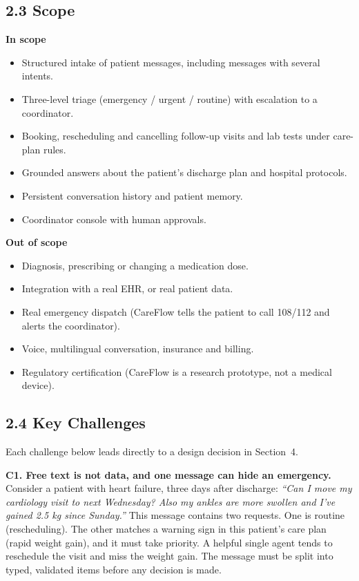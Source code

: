 \documentclass[11pt,a4paper]{article}
\begin{document}
\subsection*{2.3 Scope}

\begin{minipage}[t]{0.49\textwidth}
\textbf{In scope}
\begin{itemize}
    \item Structured intake of patient messages, including messages with several intents.
    \item Three-level triage (emergency / urgent / routine) with escalation to a coordinator.
    \item Booking, rescheduling and cancelling follow-up visits and lab tests under care-plan rules.
    \item Grounded answers about the patient's discharge plan and hospital protocols.
    \item Persistent conversation history and patient memory.
    \item Coordinator console with human approvals.
\end{itemize}
\end{minipage}\hfill
\begin{minipage}[t]{0.49\textwidth}
\textbf{Out of scope}
\begin{itemize}
    \item Diagnosis, prescribing or changing a medication dose.
    \item Integration with a real EHR, or real patient data.
    \item Real emergency dispatch (CareFlow tells the patient to call 108/112 and alerts the coordinator).
    \item Voice, multilingual conversation, insurance and billing.
    \item Regulatory certification (CareFlow is a research prototype, not a medical device).
\end{itemize}
\end{minipage}

\subsection*{2.4 Key Challenges}

Each challenge below leads directly to a design decision in Section~4.

\textbf{C1. Free text is not data, and one message can hide an emergency.} Consider a patient with heart failure, three days after discharge: \emph{``Can I move my cardiology visit to next Wednesday? Also my ankles are more swollen and I've gained 2.5 kg since Sunday.''} This message contains two requests. One is routine (rescheduling). The other matches a warning sign in this patient's care plan (rapid weight gain), and it must take priority. A helpful single agent tends to reschedule the visit and miss the weight gain. The message must be split into typed, validated items before any decision is made.
\end{document}
